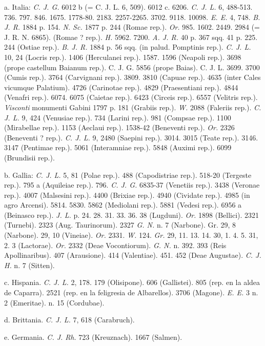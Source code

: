 \documentclass[a4paper, 11pt, oneside, polutonikogreek, german]{article}
\begin{document}
a. Italia: \emph{C. J. G.} 6012 b (= C. J. L. 6, 509). 6012 c. 6206. \emph{C. J. L.} 6, 488-513. 736. 797. 846. 1675. 1778-80. 2183. 2257-2265. 3702. 9118. 10098. \emph{E. E.} 4, 748. \emph{B. J. R.} 1884 p. 154. \emph{N. Sc.} 1877 p. 244 (Romae rep.). \emph{Or.} 985. 1602. 2449. 2984 (= J. R. N. 6865). (Romae ? rep.). \emph{H.} 5962. 7200. \emph{A. J. R.} 40 p. 367 sqq. 41 p. 225. 244 (Ostiae rep.). \emph{B. J. R.} 1884 p. 56 sqq. (in palud. Pomptinis rep.). \emph{C. J. L.} 10, 24 (Locris rep.). 1406 (Herculanei rep.). 1587. 1596 (Neapoli rep.). 3698 (prope castellum Baianum rep.). C. J. G. 5856 (prope Baias). C. J. L. 3699. 3700 (Cumis rep.). 3764 (Carvignani rep.). 3809. 3810 (Capuae rep.). 4635 (inter Cales vicumque Palatium). 4726 (Carinotae rep.). 4829 (Praesentiani rep.). 4844 (Venafri rep.). 6074. 6075 (Caietae rep.). 6423 (Circeis rep.). 6557 (Velitris rep.). \emph{Visconti} monumenti Gabini 1797 p. 181 (Grabiis rep.). \emph{W.} 2088 (Faleriis rep.). \emph{C. J. L.} 9, 424 (Venusiae rep.). 734 (Larini rep.). 981 (Compsae rep.). 1100 (Mirabellae rep.). 1153 (Aeclaui rep.). 1538-42 (Beneventi rep.). \emph{Or.} 2326 (Beneventi ? rep.). \emph{C. J. L.} 9, 2480 (Saepini rep.). 3014. 3015 (Teate rep.). 3146. 3147 (Pentimae rep.). 5061 (Interamniae rep.). 5848 (Auximi rep.). 6099 (Brundisii rep.).

b. Gallia: \emph{C. J. L.} 5, 81 (Polae rep.). 488 (Capodistriae rep.). 518-20 (Tergeste rep.). 795 a (Aquileiae rep.). 796. \emph{C. J. G.} 6835-37 (Venetiis rep.). 3438 (Veronae rep.). 4007 (Malsesini rep.). 4400 (Brixiae rep.). 4940 (Cividate rep.). 4985 (in agro Arcensi). 5814. 5830. 5862 (Mediolani rep.). 5881 (Vedesi rep.). 6956 a (Beinasco rep.). \emph{J. L.} p. 24. 28. 31. 33. 36. 38 (Lugduni). \emph{Or.} 1898 (Bellici). 2321 (Turnebi). 2323 (Aug. Taurinorum). 2327 \emph{G. N.} n. 7 (Narbone). Gr. 29, 8 (Narbone). 29, 10 (Vineiae). \emph{Or.} 2331. \emph{W.} 124. \emph{Gr.} 29, 11. 13. 14. 30, 1. 4. 5. 31, 2. 3 (Lactorae). \emph{Or.} 2332 (Deae Vocontiorum). \emph{G. N.} n. 392. 393 (Reis Apollinaribus). 407 (Arausione). 414 (Valentiae). 451. 452 (Deae Augustae). \emph{C. J. H.} n. 7 (Sitten).

c. Hispania. \emph{C. J. L.} 2, 178. 179 (Olisipone). 606 (Gallistei). 805 (rep. en la aldea de Caparra). 2521 (rep. en la feligresia de Albarellos). 3706 (Magone). \emph{E. E.} 3 n. 2 (Emeritae). n. 15 (Cordubae).

d. Brittania. \emph{C. J. L.} 7, 618 (Carabruch).

e. Germania. \emph{C. J. Rh.} 723 (Kreuznach). 1667 (Salmen).
\end{document}
